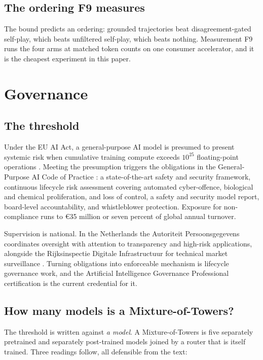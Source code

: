 \documentclass[11pt]{article}
\begin{document}
\subsection{The ordering F9 measures}

The bound predicts an ordering: grounded trajectories beat disagreement-gated self-play, which beats unfiltered self-play, which beats nothing. Measurement F9 runs the four arms at matched token counts on one consumer accelerator, and it is the cheapest experiment in this paper.

\section{Governance}
\label{sec:governance}

\subsection{The threshold}

Under the EU AI Act, a general-purpose AI model is presumed to present systemic risk when cumulative training compute exceeds $10^{25}$ floating-point operations \cite{euaiact2024}. Meeting the presumption triggers the obligations in the General-Purpose AI Code of Practice \cite{gpaicop2025}: a state-of-the-art safety and security framework, continuous lifecycle risk assessment covering automated cyber-offence, biological and chemical proliferation, and loss of control, a safety and security model report, board-level accountability, and whistleblower protection. Exposure for non-compliance runs to €35 million or seven percent of global annual turnover.

Supervision is national. In the Netherlands the Autoriteit Persoonsgegevens coordinates oversight with attention to transparency and high-risk applications, alongside the Rijksinspectie Digitale Infrastructuur for technical market surveillance \cite{ap2026,rdi2026}. Turning obligations into enforceable mechanism is lifecycle governance work, and the Artificial Intelligence Governance Professional certification \cite{iapp2024aigp} is the current credential for it.

\subsection{How many models is a Mixture-of-Towers?}
\label{sec:howmanymodels}

The threshold is written against \emph{a model}. A Mixture-of-Towers is five separately pretrained and separately post-trained models joined by a router that is itself trained. Three readings follow, all defensible from the text:
\end{document}
